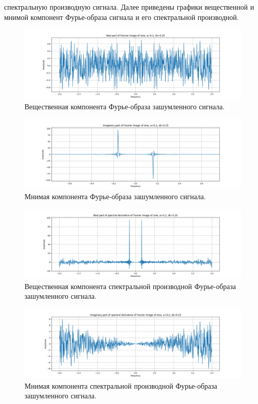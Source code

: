 \documentclass[a4paper, 12pt]{article}
\begin{document}
    спектральную производную сигнала. Далее приведены графики вещественной и мнимой компонент Фурье-образа сигнала и его спектральной производной.
    \begin{figure}[H]
        \centering
        \includegraphics[scale=0.4]{1_re_fimg_sine.png}
        \captionsetup{skip=0pt}
        \caption{Вещественная компонента Фурье-образа зашумленного сигнала.}
        \label{fig:1refis}
    \end{figure}
    \begin{figure}[H]
        \centering
        \includegraphics[scale=0.4]{1_im_fimg_sine.png}
        \captionsetup{skip=0pt}
        \caption{Мнимая компонента Фурье-образа зашумленного сигнала.}
        \label{fig:1imfis}
    \end{figure}
    \begin{figure}[H]
        \centering
        \includegraphics[scale=0.4]{1_re_spd_fimg_sine.png}
        \captionsetup{skip=0pt}
        \caption{Вещественная компонента спектральной производной Фурье-образа зашумленного сигнала.}
        \label{fig:1respdf}
    \end{figure}
    \begin{figure}[H]
        \centering
        \includegraphics[scale=0.4]{1_im_spd_fimg_sine.png}
        \captionsetup{skip=0pt}
        \caption{Мнимая компонента спектральной производной Фурье-образа зашумленного сигнала.}
        \label{fig:1imspdf}
    \end{figure}
\end{document}
